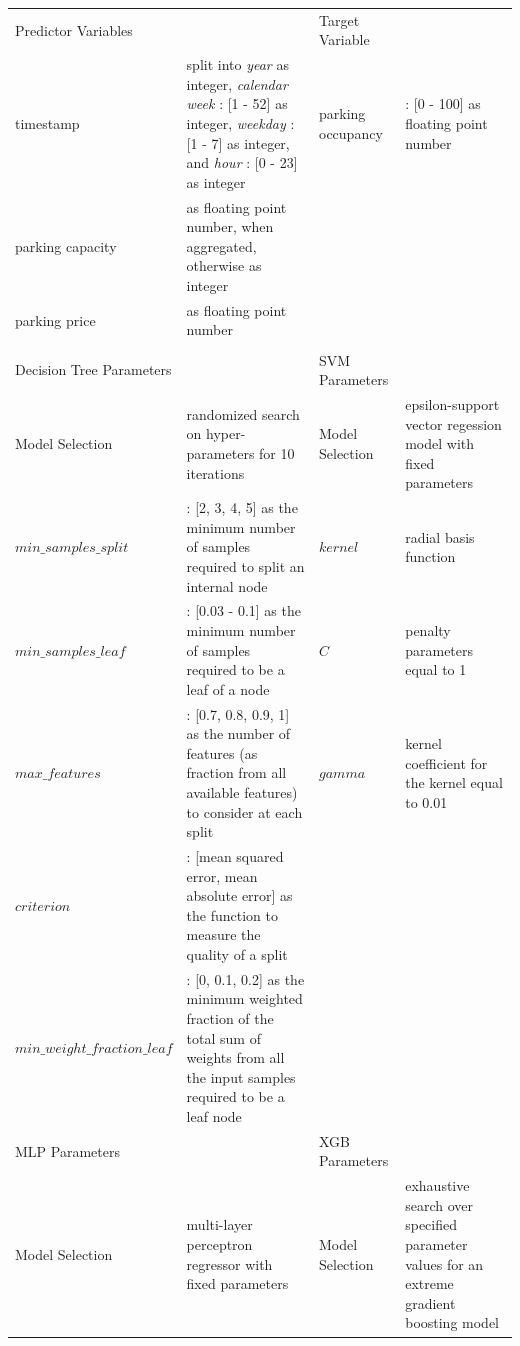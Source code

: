 	\begin{table}
		{\begin{tabular}{lp{4cm}lp{4cm}}	
				\toprule
				Predictor Variables & & Target Variable & \\
				\colrule
				timestamp & split into \textit{year} as integer, \textit{calendar week} : [1 - 52] as integer, \textit{weekday} : [1 - 7] as integer, and \textit{hour} : [0 - 23] as integer & parking occupancy & : [0 - 100] as floating point number \\
				parking capacity & as floating point number, when aggregated, otherwise as integer & & \\
				parking price & as floating point number & & \\
				&  & & \\
				\colrule
				Decision Tree Parameters & & SVM Parameters & \\
				\colrule
				Model Selection & randomized search on hyper-parameters for 10 iterations & Model Selection & epsilon-support vector regession model with fixed parameters \\
				$min\_samples\_split$ & : [2, 3, 4, 5] as the minimum number of samples required to split an internal node & $kernel$ & radial basis function \\
				$min\_samples\_leaf$ & : [0.03 - 0.1] as the minimum number of samples required to be a leaf of a node & $C$ & penalty parameters equal to 1 \\
				$max\_features$ & : [0.7, 0.8, 0.9, 1] as the number of features (as fraction from all available features) to consider at each split & $gamma$ & kernel coefficient for the kernel equal to 0.01 \\
				$criterion$ & : [mean squared error, mean absolute error] as the function to measure the quality of a split &  &  \\
				$min\_weight\_fraction\_leaf$ & : [0, 0.1, 0.2] as the minimum weighted fraction of the total sum of weights from all the input samples required to be a leaf node & & \\
				\colrule
				MLP Parameters & & XGB Parameters & \\
				\colrule
				Model Selection & multi-layer perceptron regressor with fixed parameters & Model Selection & exhaustive search over specified parameter values for an extreme gradient boosting model \\
				

\end{tabular}}
\end{table}

